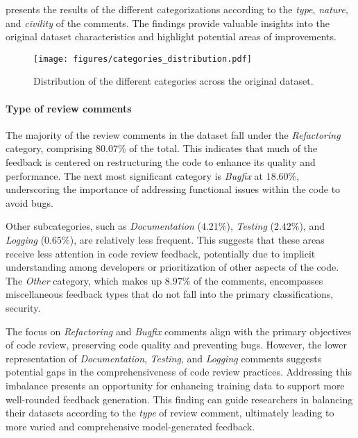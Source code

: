  presents the results of the different categorizations according to the \emph{type}, \emph{nature}, and \emph{civility} of the comments. The findings provide valuable insights into the original dataset characteristics and highlight potential areas of improvements.

\begin{figure*}
    \centering
    \texttt{[image: figures/categories\_distribution.pdf]}
    \caption{Distribution of the different categories across the original dataset.}
    \label{fig:initinal_categ_dist}
    \vspace{-1em}
\end{figure*}


\paragraph*{\textbf{Type of review comments}}

The majority of the review comments in the dataset fall under the \emph{Refactoring} category, comprising $80.07\%$ of the total. This indicates that much of the feedback is centered on restructuring the code to enhance its quality and performance. The next most significant category is \emph{Bugfix} at $18.60\%$, underscoring the importance of addressing functional issues within the code to avoid bugs.

Other subcategories, such as \emph{Documentation} ($4.21\%$), \emph{Testing} ($2.42\%$), and \emph{Logging} ($0.65\%$), are relatively less frequent. This suggests that these areas receive less attention in code review feedback, potentially due to implicit understanding among developers or prioritization of other aspects of the code. The \emph{Other} category, which makes up $8.97\%$ of the comments, encompasses miscellaneous feedback types that do not fall into the primary classifications, \eg security.

The focus on \emph{Refactoring} and \emph{Bugfix} comments align with the primary objectives of code review, \ie preserving code quality and preventing bugs. However, the lower representation of \emph{Documentation}, \emph{Testing}, and \emph{Logging} comments suggests potential gaps in the comprehensiveness of code review practices. Addressing this imbalance presents an opportunity for enhancing training data to support more well-rounded feedback generation. This finding can guide researchers in balancing their datasets according to the \emph{type} of review comment, ultimately leading to more varied and comprehensive model-generated feedback.


